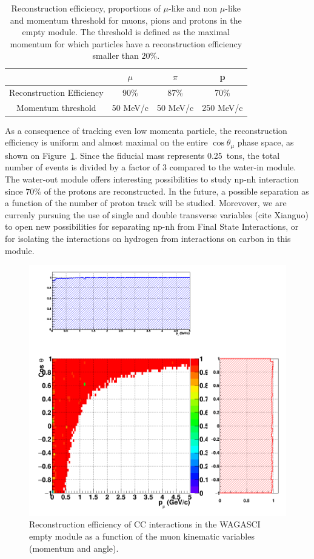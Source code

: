 \begin{table}[htb]
  \small
  \begin{center}
    \begin{tabular}{|c|c|c|c|}
      \hline
      \hline
      & $\mu$ & $\pi$ & p \\
      \hline
      Reconstruction Efficiency & 90\% & 87\% & 70\% \\
      Momentum threshold & 50 MeV/c & 50 MeV/c & 250 MeV/c  \\
      \hline
      \hline 
    \end{tabular}
    \caption{\label{tab:reconstructedparticles_empty} Reconstruction efficiency, proportions of $\mu$-like and non $\mu$-like and momentum threshold for muons, pions and protons in the empty module. The threshold is defined as the maximal momentum for which particles have a reconstruction efficiency smaller than $20\%$.}
  \end{center}
\end{table}
As a consequence of tracking even low momenta particle, the reconstruction efficiency is uniform and almost maximal on the entire $\cos \theta_{\mu}$ phase space, as shown on Figure~\ref{fig:efficiency_muonkinematics_empty}. Since the fiducial mass represents 0.25~tons, the total number of events is divided by a factor of 3 compared to the water-in module. The water-out module offers interesting possibilities to study np-nh interaction since $70\%$ of the protons are reconstructed. In the future, a possible separation as a function of the number of proton track will be studied. Morevover, we are currenly pursuing the use of single and double transverse variables (cite Xianguo) to open new possibilities for separating np-nh from Final State Interactions, or for isolating the interactions on hydrogen from interactions on carbon in this module. 

\begin{figure}
  \centering
\includegraphics[width=.7\textwidth]{fig/Efficiency_MuonKinematics_Empty.png}
  \caption{\label{fig:efficiency_muonkinematics_empty} Reconstruction efficiency of CC interactions in the WAGASCI empty module as a function of the muon kinematic variables (momentum and angle).}
\end{figure}
\clearpage

